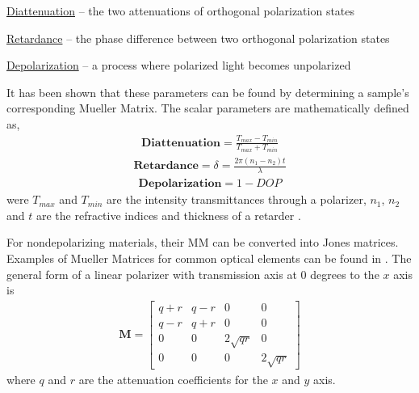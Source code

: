 
\underline{Diattenuation} – the two attenuations of orthogonal polarization states \cite{chipman}

\underline{Retardance} – the phase difference between two orthogonal polarization states \cite{giakos}

\underline{Depolarization} – a process where polarized light becomes unpolarized \cite{giakos}

It has been shown that these parameters can be found by determining a sample's corresponding Mueller Matrix. The scalar parameters are mathematically defined as,
\begin{align}
    \mathbf{Diattenuation} = \frac{T_{max} - T_{min}}{T_{max} + T_{min}}
\end{align}
\begin{align}
    \mathbf{Retardance} = \delta = \frac{2\pi(n_1 - n_2)t}{\lambda}
\end{align}
\begin{align}
    \mathbf{Depolarization} = 1 - DOP
\end{align}
were $T_{max}$ and $T_{min}$ are the intensity transmittances through a polarizer, $n_1$, $n_2$ and $t$ are the refractive indices and thickness of a retarder \cite{chipman}.

For nondepolarizing materials, their MM can be converted into Jones matrices.   Examples of Mueller Matrices for common optical elements can be found in \cite{chipman}.  The general form of a linear polarizer with transmission axis at 0 degrees to the $x$ axis is
%
\begin{align}
    \mathbf{M} =
    \begin{bmatrix}
        q + r & q - r & 0 & 0 \\
        q-r & q+r & 0  & 0 \\
        0 & 0 & 2\sqrt{qr} & 0 \\
        0 & 0 & 0 & 2\sqrt{qr}
    \end{bmatrix}
\end{align}
%
where $q$ and $r$ are the attenuation coefficients for the $x$ and $y$ axis.


